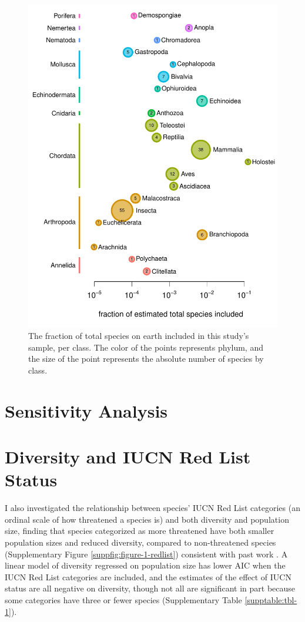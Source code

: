 \documentclass[11pt]{article}
\begin{document}
\begin{figure}[!htb]
  \centering
  \includegraphics[]{figures/species_counts.pdf}
  \caption{The fraction of total species on earth included in this study's
  sample, per class. The color of the points represents phylum, and the size of
the point represents the absolute number of species by class.}
  \label{suppfig:species_counts}
\end{figure}

\section{Sensitivity Analysis}




\section{Diversity and IUCN Red List Status}
\label{supinfo:div-iucn}

I also investigated the relationship between species' IUCN Red List categories
(an ordinal scale of how threatened a species is) and both diversity and
population size, finding that species categorized as more threatened have both
smaller population sizes and reduced diversity, compared to non-threatened
species (Supplementary Figure \ref{suppfig:figure-1-redlist}) consistent with
past work \parencite{Spielman2004-mt}. A linear model of diversity regressed on
population size has lower AIC when the IUCN Red List categories are included,
and the estimates of the effect of IUCN status are all negative on diversity,
though not all are significant in part because some categories have three or
fewer species (Supplementary Table \ref{supptable:tbl-1}).
\end{document}

